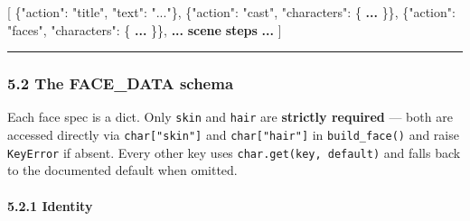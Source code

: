 \documentclass[
  12pt,
  letterpaper,
]{book}
\newenvironment{Shaded}{}{}
\newcommand{\DataTypeTok}[1]{\textcolor[rgb]{0.56,0.13,0.00}{#1}}
\newcommand{\ErrorTok}[1]{\textcolor[rgb]{1.00,0.00,0.00}{\textbf{#1}}}
\newcommand{\FunctionTok}[1]{\textcolor[rgb]{0.02,0.16,0.49}{#1}}
\newcommand{\OtherTok}[1]{\textcolor[rgb]{0.00,0.44,0.13}{#1}}
\newcommand{\StringTok}[1]{\textcolor[rgb]{0.25,0.44,0.63}{#1}}
\begin{document}
\begin{Shaded}
\begin{Highlighting}[]
\OtherTok{[}
  \FunctionTok{\{}\DataTypeTok{"action"}\FunctionTok{:} \StringTok{"title"}\FunctionTok{,} \DataTypeTok{"text"}\FunctionTok{:} \StringTok{"..."}\FunctionTok{\}}\OtherTok{,}
  \FunctionTok{\{}\DataTypeTok{"action"}\FunctionTok{:} \StringTok{"cast"}\FunctionTok{,}  \DataTypeTok{"characters"}\FunctionTok{:} \FunctionTok{\{} \ErrorTok{...} \FunctionTok{\}\}}\OtherTok{,}
  \FunctionTok{\{}\DataTypeTok{"action"}\FunctionTok{:} \StringTok{"faces"}\FunctionTok{,} \DataTypeTok{"characters"}\FunctionTok{:} \FunctionTok{\{} \ErrorTok{...} \FunctionTok{\}\}}\OtherTok{,}
  \ErrorTok{...} \ErrorTok{scene} \ErrorTok{steps} \ErrorTok{...}
\OtherTok{]}
\end{Highlighting}
\end{Shaded}

\begin{center}\rule{0.5\linewidth}{0.5pt}\end{center}

\subsubsection{5.2 The FACE\_DATA schema}\label{the-face_data-schema}

Each face spec is a dict. Only \texttt{skin} and \texttt{hair} are
\textbf{strictly required} --- both are accessed directly via
\texttt{char{[}"skin"{]}} and \texttt{char{[}"hair"{]}} in
\texttt{build\_face()} and raise \texttt{KeyError} if absent. Every
other key uses \texttt{char.get(key,\ default)} and falls back to the
documented default when omitted.

\paragraph{5.2.1 Identity}\label{identity2}
\end{document}
